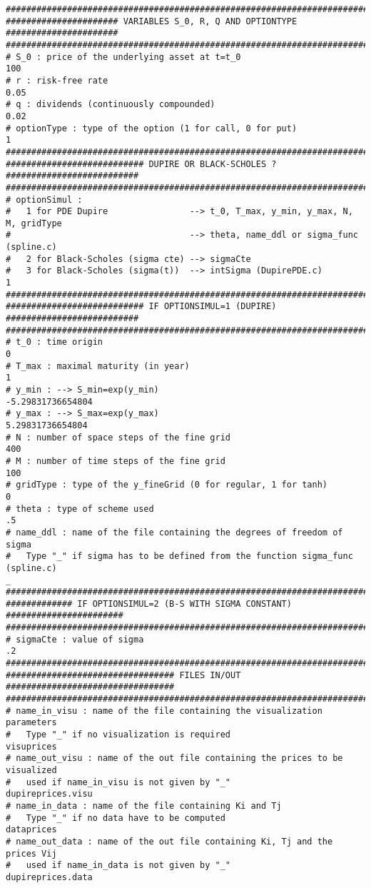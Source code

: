 \documentclass[12pt]{article}
\begin{document}
\begin{verbatim}
################################################################################
###################### VARIABLES S_0, R, Q AND OPTIONTYPE ######################
################################################################################
# S_0 : price of the underlying asset at t=t_0
100
# r : risk-free rate     
0.05
# q : dividends (continuously compounded) 
0.02
# optionType : type of the option (1 for call, 0 for put)  
1
################################################################################
########################### DUPIRE OR BLACK-SCHOLES ? ##########################
################################################################################
# optionSimul :
#   1 for PDE Dupire                --> t_0, T_max, y_min, y_max, N, M, gridType
#                                   --> theta, name_ddl or sigma_func (spline.c)
#   2 for Black-Scholes (sigma cte) --> sigmaCte
#   3 for Black-Scholes (sigma(t))  --> intSigma (DupirePDE.c)
1
################################################################################
########################### IF OPTIONSIMUL=1 (DUPIRE) ##########################
################################################################################
# t_0 : time origin
0
# T_max : maximal maturity (in year)
1
# y_min : --> S_min=exp(y_min)     
-5.29831736654804
# y_max : --> S_max=exp(y_max)
5.29831736654804
# N : number of space steps of the fine grid
400
# M : number of time steps of the fine grid
100
# gridType : type of the y_fineGrid (0 for regular, 1 for tanh)
0
# theta : type of scheme used
.5
# name_ddl : name of the file containing the degrees of freedom of sigma
#   Type "_" if sigma has to be defined from the function sigma_func (spline.c)
_
################################################################################
############# IF OPTIONSIMUL=2 (B-S WITH SIGMA CONSTANT) #######################
################################################################################
# sigmaCte : value of sigma
.2
################################################################################
################################# FILES IN/OUT #################################
################################################################################
# name_in_visu : name of the file containing the visualization parameters
#   Type "_" if no visualization is required
visuprices
# name_out_visu : name of the out file containing the prices to be visualized
#   used if name_in_visu is not given by "_"
dupireprices.visu
# name_in_data : name of the file containing Ki and Tj
#   Type "_" if no data have to be computed
dataprices
# name_out_data : name of the out file containing Ki, Tj and the prices Vij
#   used if name_in_data is not given by "_"
dupireprices.data
\end{verbatim}
\end{document}
